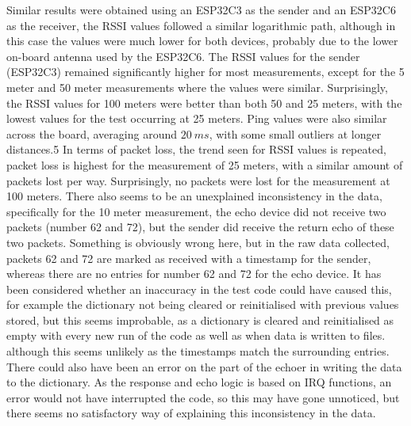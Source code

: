 Similar results were obtained using an ESP32C3 as the sender and an ESP32C6 as the receiver, the RSSI values followed a similar logarithmic path, although in this case the values were much lower for both devices, probably due to the lower on-board antenna used by the ESP32C6. The RSSI values for the sender (ESP32C3) remained significantly higher for most measurements, except for the 5 meter and 50 meter measurements where the values were similar. Surprisingly, the RSSI values for 100 meters were better than both 50 and 25 meters, with the lowest values for the test occurring at 25 meters. Ping values were also similar across the board, averaging around $20\ ms$, with some small outliers at longer distances.5
In terms of packet loss, the trend seen for RSSI values is repeated, packet loss is highest for the measurement of 25 meters, with a similar amount of packets lost per way. Surprisingly, no packets were lost for the measurement at 100 meters. 
There also seems to be an unexplained inconsistency in the data, specifically for the 10 meter measurement, the echo device did not receive two packets (number 62 and 72), but the sender did receive the return echo of these two packets. Something is obviously wrong here, but in the raw data collected, packets 62 and 72 are marked as received with a timestamp for the sender, whereas there are no entries for number 62 and 72 for the echo device. It has been considered whether an inaccuracy in the test code could have caused this, for example the dictionary not being cleared or reinitialised with previous values stored, but this seems improbable, as a dictionary is cleared and reinitialised as empty with every new run of the code as well as when data is written to files. although this seems unlikely as the timestamps match the surrounding entries. There could also have been an error on the part of the echoer in writing the data to the dictionary. As the response and echo logic is based on IRQ functions, an error would not have interrupted the code, so this may have gone unnoticed, but there seems no satisfactory way of explaining this inconsistency in the data. 

